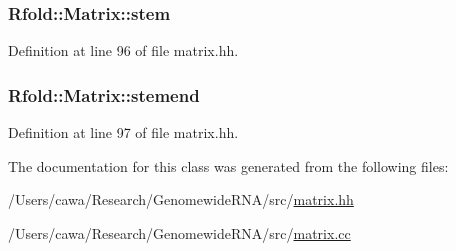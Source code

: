 \hypertarget{class_rfold_1_1_matrix_a20247950e209e5d6d72ef7471c31ec7e}{
\subsubsection[{stem}]{ Rfold\+::\+Matrix\+::stem}}\label{class_rfold_1_1_matrix_a20247950e209e5d6d72ef7471c31ec7e}


Definition at line 96 of file matrix.\+hh.

\hypertarget{class_rfold_1_1_matrix_a64d321f4b4a5447961cd0acc356b2758}{
\subsubsection[{stemend}]{ Rfold\+::\+Matrix\+::stemend}}\label{class_rfold_1_1_matrix_a64d321f4b4a5447961cd0acc356b2758}


Definition at line 97 of file matrix.\+hh.



The documentation for this class was generated from the following files\+:\begin{DoxyCompactItemize}
\item 
/\+Users/cawa/\+Research/\+Genomewide\+R\+N\+A/src/\hyperlink{matrix_8hh}{matrix.\+hh}\item 
/\+Users/cawa/\+Research/\+Genomewide\+R\+N\+A/src/\hyperlink{matrix_8cc}{matrix.\+cc}\end{DoxyCompactItemize}
